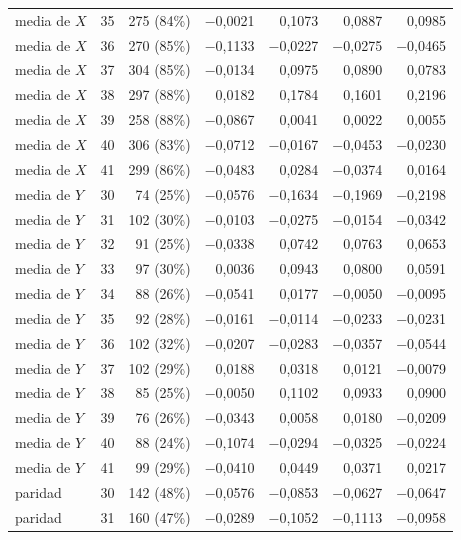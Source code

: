 \begin{table}[htbp]
{\begin{tabular}{@{}lrrrrrr@{}}
        media de $X$ & 35 & 275 (84\%) & $-$0,0021 & 0,1073 & 0,0887 & 0,0985 \\
        media de $X$ & 36 & 270 (85\%) & $-$0,1133 & $-$0,0227 & $-$0,0275 & $-$0,0465 \\
        media de $X$ & 37 & 304 (85\%) & $-$0,0134 & 0,0975 & 0,0890 & 0,0783 \\
        media de $X$ & 38 & 297 (88\%) & 0,0182 & 0,1784 & 0,1601 & 0,2196 \\
        media de $X$ & 39 & 258 (88\%) & $-$0,0867 & 0,0041 & 0,0022 & 0,0055 \\
        media de $X$ & 40 & 306 (83\%) & $-$0,0712 & $-$0,0167 & $-$0,0453 & $-$0,0230 \\
        media de $X$ & 41 & 299 (86\%) & $-$0,0483 & 0,0284 & $-$0,0374 & 0,0164 \\
        media de $Y$ & 30 & 74 (25\%) & $-$0,0576 & $-$0,1634 & $-$0,1969 & $-$0,2198 \\
        media de $Y$ & 31 & 102 (30\%) & $-$0,0103 & $-$0,0275 & $-$0,0154 & $-$0,0342 \\
        media de $Y$ & 32 & 91 (25\%) & $-$0,0338 & 0,0742 & 0,0763 & 0,0653 \\
        media de $Y$ & 33 & 97 (30\%) & 0,0036 & 0,0943 & 0,0800 & 0,0591 \\
        media de $Y$ & 34 & 88 (26\%) & $-$0,0541 & 0,0177 & $-$0,0050 & $-$0,0095 \\
        media de $Y$ & 35 & 92 (28\%) & $-$0,0161 & $-$0,0114 & $-$0,0233 & $-$0,0231 \\
        media de $Y$ & 36 & 102 (32\%) & $-$0,0207 & $-$0,0283 & $-$0,0357 & $-$0,0544 \\
        media de $Y$ & 37 & 102 (29\%) & 0,0188 & 0,0318 & 0,0121 & $-$0,0079 \\
        media de $Y$ & 38 & 85 (25\%) & $-$0,0050 & 0,1102 & 0,0933 & 0,0900 \\
        media de $Y$ & 39 & 76 (26\%) & $-$0,0343 & 0,0058 & 0,0180 & $-$0,0209 \\
        media de $Y$ & 40 & 88 (24\%) & $-$0,1074 & $-$0,0294 & $-$0,0325 & $-$0,0224 \\
        media de $Y$ & 41 & 99 (29\%) & $-$0,0410 & 0,0449 & 0,0371 & 0,0217 \\
        paridad & 30 & 142 (48\%) & $-$0,0576 & $-$0,0853 & $-$0,0627 & $-$0,0647 \\
        paridad & 31 & 160 (47\%) & $-$0,0289 & $-$0,1052 & $-$0,1113 & $-$0,0958 \\

\end{tabular}}
\end{table}
